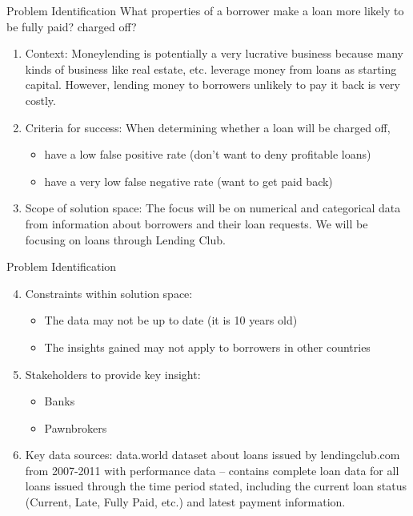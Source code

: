 \documentclass{beamer}
\begin{document}
\begin{frame}{Problem Identification}
What properties of a borrower make a loan more likely to be fully paid? charged
off?
\begin{enumerate}
\item Context: 
Moneylending is potentially a very lucrative business because many kinds of
business like real estate, etc. leverage money from loans as starting capital.
However, lending money to borrowers unlikely to pay it back is very costly.
\item Criteria for success: When determining whether a loan will be charged off,
\begin{itemize}
\item have a low false positive rate (don't want to deny profitable loans)
\item have a very low false negative rate (want to get paid back)
\end{itemize}
\item Scope of solution space: The focus will be on numerical and categorical
data from information about borrowers and their loan requests. We will be
focusing on loans through Lending Club.
\end{enumerate}
\end{frame}

\begin{frame}{Problem Identification}
\begin{enumerate}
\setcounter{enumi}{3}
\item Constraints within solution space:
\begin{itemize}
\item The data may not be up to date (it is 10 years old)
\item The insights gained may not apply to borrowers in other countries
\end{itemize}
\item Stakeholders to provide key insight:
\begin{itemize}
\item Banks
\item Pawnbrokers
\end{itemize}
\item Key data sources:
data.world dataset about loans issued by lendingclub.com from 2007-2011
with performance data -- contains complete loan data for all loans issued
through the time period stated, including the current loan status (Current,
Late, Fully Paid, etc.) and latest payment information.
\end{enumerate}
\end{frame}
\end{document}
